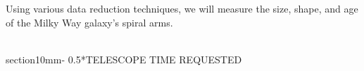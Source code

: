 \documentclass[letterpaper,11pt]{article}
\makeatletter
\renewcommand{\section}{\@startsection%
{section}{1}{0mm}{-\baselineskip}%
{0.5\baselineskip}{\normalfont\Large\bfseries}}%
\newenvironment{Frame}{%
  \noindent\setbox\FrameBox\hbox\bgroup\minipage{1.01\textwidth}\parskip\baselineskip\ignorespaces
}{%
  \endminipage\egroup\fbox{\box\FrameBox}\par
}
\makeatother
\begin{document}
~\\~\\ %

\begin{Frame}
\noindent {\bf \\Abstract}
\smallskip%

Using various data reduction techniques, we will measure the size, shape, and age of the Milky Way galaxy's spiral arms.

\end{Frame}
~\\


\section*{TELESCOPE TIME REQUESTED}

\begin{table}[H]\label{tab:request-telescope-time}
	\begin{center}
	\end{center}
\end{table}
\end{document}
